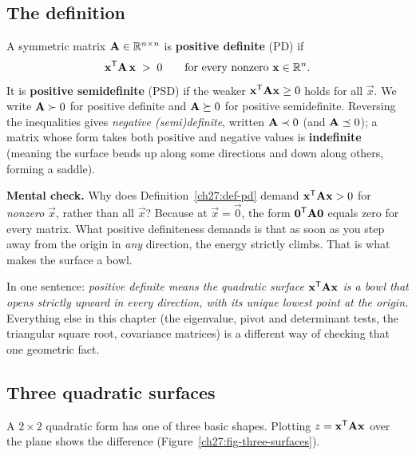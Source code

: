 \subsection{The definition}

\begin{definition}
\label{ch27:def-pd}
A symmetric matrix $\mathbf{A} \in \mathbb{R}^{n\times n}$ is \textbf{positive definite} (PD) if
\[
  \mathbf{x}^{\mathsf{T}} \mathbf{A}\, \mathbf{x} \;>\; 0 \qquad \text{for every nonzero } \mathbf{x} \in \mathbb{R}^n.
\]
It is \textbf{positive semidefinite} (PSD) if the weaker $\mathbf{x}^{\mathsf{T}}\mathbf{A}\mathbf{x} \geq 0$ holds for
all $\vec{x}$. We write $\mathbf{A} \succ 0$ for positive definite and $\mathbf{A} \succeq 0$ for positive
semidefinite. Reversing the inequalities gives \emph{negative (semi)definite}, written $\mathbf{A}\prec 0$
(and $\mathbf{A}\preceq 0$); a matrix whose form
takes both positive and negative values is \textbf{indefinite} (meaning the surface bends up along
some directions and down along others, forming a saddle).
\end{definition}

\begin{recoverybox}
\textbf{Mental check.} Why does Definition~\ref{ch27:def-pd} demand $\mathbf{x}^{\mathsf{T}}\mathbf{A}\mathbf{x} > 0$
for \emph{nonzero} $\vec{x}$, rather than all $\vec{x}$? Because at $\vec{x} = \vec{0}$, the form
$\mathbf{0}^{\mathsf{T}}\mathbf{A}\mathbf{0}$ equals zero for every matrix. What positive definiteness demands is that
as soon as you step away from the origin in \emph{any} direction, the energy strictly climbs. That
is what makes the surface a bowl.
\end{recoverybox}

\begin{focusbox}
In one sentence: \emph{positive definite means the quadratic surface
$\mathbf{x}^{\mathsf{T}}\mathbf{A}\mathbf{x}$ is a bowl that opens strictly upward in every direction, with its unique
lowest point at the origin.} Everything else in this chapter (the eigenvalue, pivot and determinant
tests, the triangular square root, covariance matrices) is a different way of checking that one
geometric fact.
\end{focusbox}

\subsection{Three quadratic surfaces}

A $2\times 2$ quadratic form has one of three basic shapes. Plotting
$z = \mathbf{x}^{\mathsf{T}}\mathbf{A}\mathbf{x}$ over the plane shows the difference
(Figure~\ref{ch27:fig-three-surfaces}).

